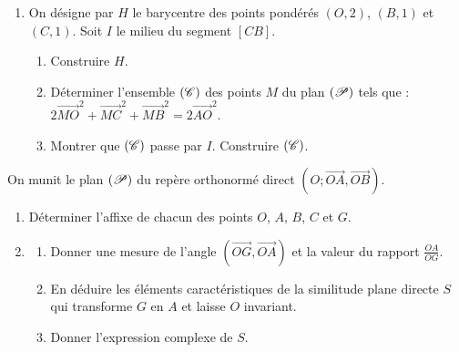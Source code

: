 \begin{description}
\begin{enumerate}
\begin{enumerate}
                        \end{enumerate}
                  \item On d\'esigne par $H$ le barycentre des points pond\'er\'es $(O,2)$, $(B,1)$ et $(C,1)$.
                        Soit $I$ le milieu du segment $[CB]$.
                        \begin{enumerate}
                              \item Construire $H$.
                              \item D\'eterminer l'ensemble $(\mathscr{C})$ des points $M$ du plan $(\mathscr{P})$ tels que : 
                                    $ 2 \overrightarrow{MO}^2 + \overrightarrow{MC}^2 + \overrightarrow{MB}^2 
                                          = 2 \overrightarrow{AO}^2 $.
                              \item Montrer que $(\mathscr{C})$ passe par $I$.
                                    Construire $(\mathscr{C})$.
                        \end{enumerate}
            \end{enumerate}
            \item[Partie B] 
                  On munit le plan $(\mathscr{P})$ du rep\`ere orthonorm\'e direct $(O ; \overrightarrow{OA} , \overrightarrow{OB})$.
                  \begin{enumerate}
                        \item D\'eterminer l'affixe de chacun des points $O$, $A$, $B$, $C$ et $G$.
                        \item \begin{enumerate}
                                    \item Donner une mesure de l'angle $(\overrightarrow{OG} , \overrightarrow{OA})$
                                          et la valeur du rapport $\frac{OA}{OG}$.
                                    \item En d\'eduire les \'el\'ements caract\'eristiques de la similitude plane directe $S$
                                          qui transforme $G$ en $A$ et laisse $O$ invariant.
                                    \item Donner l'expression complexe de $S$.
                              \end{enumerate}
                  \end{enumerate}
      \end{description}
